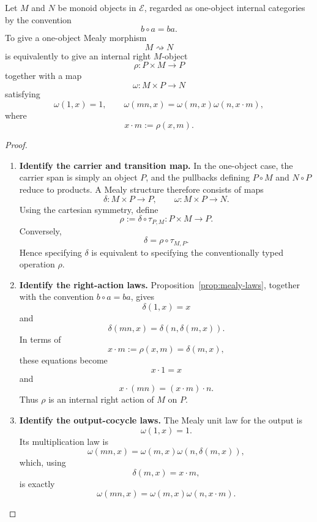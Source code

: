 \begin{proposition}
\label{prop:one-object-mealy-morphisms}
    Let \(M\) and \(N\) be monoid objects in \(\mathcal E\), regarded as one-object internal categories by the convention
    \[
        b\circ a=ba.
    \]
    To give a one-object Mealy morphism
    \[
        M\rightsquigarrow N
    \]
    is equivalently to give an internal right \(M\)-object
    \[
        \rho:P\times M\to P
    \]
    together with a map
    \[
        \omega:M\times P\to N
    \]
    satisfying
    \[
        \omega(1,x)=1,
        \qquad
        \omega(mn,x)
        =
        \omega(m,x)\omega(n,x\cdot m),
    \]
    where
    \[
        x\cdot m:=\rho(x,m).
    \]
\end{proposition}
\begin{proof}
    \leavevmode
    \begin{enumerate}
        \item \textbf{Identify the carrier and transition map.} In the one-object case, the carrier span is simply an object \(P\), and the pullbacks defining \(P\circ M\) and \(N\circ P\) reduce to products. A Mealy structure therefore consists of maps
        \[
            \delta:M\times P\to P,
            \qquad
            \omega:M\times P\to N.
        \]
        Using the cartesian symmetry, define
        \[
            \rho
            :=
            \delta\circ\tau_{P,M}
            :
            P\times M\to P.
        \]
        Conversely,
        \[
            \delta
            =
            \rho\circ\tau_{M,P}.
        \]
        Hence specifying \(\delta\) is equivalent to specifying the conventionally typed operation \(\rho\).

        \item \textbf{Identify the right-action laws.} Proposition~\ref{prop:mealy-laws}, together with the convention \(b\circ a=ba\), gives
        \[
            \delta(1,x)=x
        \]
        and
        \[
            \delta(mn,x)
            =
            \delta(n,\delta(m,x)).
        \]
        In terms of
        \[
            x\cdot m
            :=
            \rho(x,m)
            =
            \delta(m,x),
        \]
        these equations become
        \[
            x\cdot1=x
        \]
        and
        \[
            x\cdot(mn)
            =
            (x\cdot m)\cdot n.
        \]
        Thus \(\rho\) is an internal right action of \(M\) on \(P\).

        \item \textbf{Identify the output-cocycle laws.} The Mealy unit law for the output is
        \[
            \omega(1,x)=1.
        \]
        Its multiplication law is
        \[
            \omega(mn,x)
            =
            \omega(m,x)\omega(n,\delta(m,x)),
        \]
        which, using
        \[
            \delta(m,x)=x\cdot m,
        \]
        is exactly
        \[
            \omega(mn,x)
            =
            \omega(m,x)\omega(n,x\cdot m).
        \]


\end{enumerate}
\end{proof}
